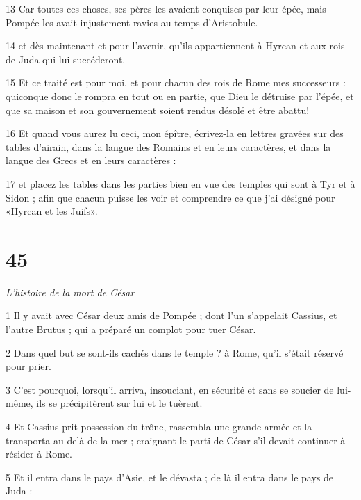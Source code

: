 \par 13 Car toutes ces choses, ses pères les avaient conquises par leur épée, mais Pompée les avait injustement ravies au temps d'Aristobule.

\par 14 et dès maintenant et pour l'avenir, qu'ils appartiennent à Hyrcan et aux rois de Juda qui lui succéderont.

\par 15 Et ce traité est pour moi, et pour chacun des rois de Rome mes successeurs : quiconque donc le rompra en tout ou en partie, que Dieu le détruise par l'épée, et que sa maison et son gouvernement soient rendus désolé et être abattu!

\par 16 Et quand vous aurez lu ceci, mon épître, écrivez-la en lettres gravées sur des tables d'airain, dans la langue des Romains et en leurs caractères, et dans la langue des Grecs et en leurs caractères :

\par 17 et placez les tables dans les parties bien en vue des temples qui sont à Tyr et à Sidon ; afin que chacun puisse les voir et comprendre ce que j'ai désigné pour «Hyrcan et les Juifs».

\chapter{45}

\par \textit{L'histoire de la mort de César}

\par 1 Il y avait avec César deux amis de Pompée ; dont l'un s'appelait Cassius, et l'autre Brutus ; qui a préparé un complot pour tuer César.

\par 2 Dans quel but se sont-ils cachés dans le temple ? à Rome, qu'il s'était réservé pour prier.

\par 3 C'est pourquoi, lorsqu'il arriva, insouciant, en sécurité et sans se soucier de lui-même, ils se précipitèrent sur lui et le tuèrent.

\par 4 Et Cassius prit possession du trône, rassembla une grande armée et la transporta au-delà de la mer ; craignant le parti de César s'il devait continuer à résider à Rome.

\par 5 Et il entra dans le pays d'Asie, et le dévasta ; de là il entra dans le pays de Juda :

